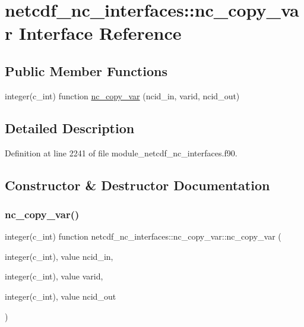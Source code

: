 \hypertarget{interfacenetcdf__nc__interfaces_1_1nc__copy__var}{}\section{netcdf\+\_\+nc\+\_\+interfaces\+:\+:nc\+\_\+copy\+\_\+var Interface Reference}
\label{interfacenetcdf__nc__interfaces_1_1nc__copy__var}
\subsection*{Public Member Functions}
\begin{DoxyCompactItemize}
\item 
integer(c\+\_\+int) function \hyperlink{interfacenetcdf__nc__interfaces_1_1nc__copy__var_a43e853d0a47ac43d2a3d7c6cb243db5a}{nc\+\_\+copy\+\_\+var} (ncid\+\_\+in, varid, ncid\+\_\+out)
\end{DoxyCompactItemize}


\subsection{Detailed Description}


Definition at line 2241 of file module\+\_\+netcdf\+\_\+nc\+\_\+interfaces.\+f90.



\subsection{Constructor \& Destructor Documentation}
\mbox{\label{interfacenetcdf__nc__interfaces_1_1nc__copy__var_a43e853d0a47ac43d2a3d7c6cb243db5a}} 
\subsubsection{\texorpdfstring{nc\+\_\+copy\+\_\+var()}{nc\_copy\_var()}}
{\footnotesize\ttfamily integer(c\+\_\+int) function netcdf\+\_\+nc\+\_\+interfaces\+::nc\+\_\+copy\+\_\+var\+::nc\+\_\+copy\+\_\+var (\begin{DoxyParamCaption}\item[{integer(c\+\_\+int), value}]{ncid\+\_\+in,  }\item[{integer(c\+\_\+int), value}]{varid,  }\item[{integer(c\+\_\+int), value}]{ncid\+\_\+out }\end{DoxyParamCaption})}



